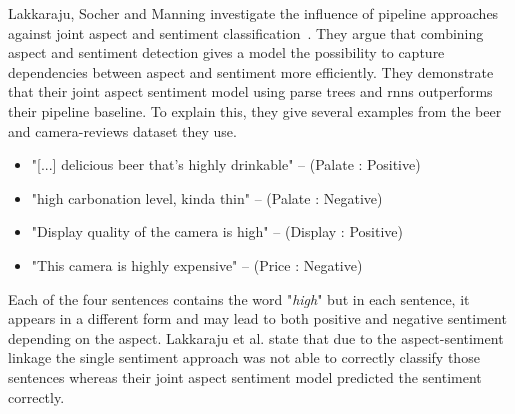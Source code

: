 Lakkaraju, Socher and Manning investigate the influence of pipeline approaches against joint aspect and sentiment classification~\cite{Lakkaraju2014}. They argue that combining aspect and sentiment detection gives a model the possibility to capture dependencies between aspect and sentiment more efficiently. They demonstrate that their joint aspect sentiment model using parse trees and \glspl{rnn} outperforms their pipeline baseline. To explain this, they give several examples from the beer~\cite{McAuley2012, McAuley2013b} and camera-reviews dataset they use. 

\begin{itemize}
    \item "{[...]} delicious beer that’s highly drinkable" -- {(Palate : Positive)}
    \item "high carbonation level, kinda thin" -- {(Palate : Negative)}
    \item "Display quality of the camera is high" -- {(Display : Positive)}
    \item "This camera is highly expensive" -- {(Price : Negative)}
\end{itemize}

Each of the four sentences contains the word "\textit{high}" but in each sentence, it appears in a different form and may lead to both positive and negative sentiment depending on the aspect. Lakkaraju et al. state that due to the aspect-sentiment linkage the single sentiment approach was not able to correctly classify those sentences whereas their joint aspect sentiment model predicted the sentiment correctly.
\medskip

